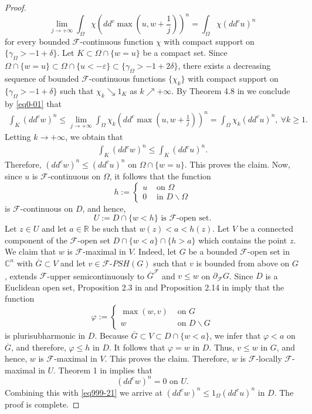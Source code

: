 \documentclass[3p,times]{elsarticle}
\numberwithin{equation}{section}
\newtheorem{The main theorem}[theorem]{The main theorem}
\theoremstyle{definition}
\begin{document}
\begin{proof}
\begin{equation} \label{eq0-01}
\lim_{j \to +\infty} \int_\Omega \chi (dd^c \max(u, w+\frac{1}{j}))^n  = \int_\Omega \chi (dd^c u)^n
\end{equation} 
for every bounded $\mathcal F $-continuous function $\chi$ with compact support on $\{ \gamma_\Omega  >-1+\delta \}$.
Let $K\subset \Omega \cap \{w=u\}$ be a compact set. Since $\Omega \cap \{w=u\} \subset \Omega \cap  \{u<-\varepsilon\}  \subset \{ \gamma_\Omega  >-1+  2 \delta \}$, there exists    a decreasing sequence of bounded $\mathcal F $-continuous functions  $\{\chi_k\}$   with compact support on $\{ \gamma_\Omega  >-1+\delta \}$ such that $\chi_k \searrow 1_K$ as $k \nearrow +\infty$. By
Theorem 4.8 in \cite{KW14}  we conclude by \eqref{eq0-01} that 
\begin{align*}
\int_K    (dd^c w)^n 
\leq \lim_{j \to +\infty} \int_\Omega \chi _k(dd^c \max(u, w+\frac{1}{j}))^n  
= \int_\Omega \chi_k (dd^c u)^n, \ \forall k \geq 1.
\end{align*}
Letting $k\to+\infty$, we obtain that 
\begin{align*}
\int _K   (dd^c w)^n 
\leq   \int_K (dd^c u)^n .
\end{align*}
Therefore, 
$
 (dd^c w)^n \leq  (dd^c u)^n \text{ on } \Omega \cap  \{w=u\}.
$
This proves the claim.   
Now, since $u$ is $\mathcal F$-continuous on $\Omega$, it follows that  the function 
$$
h := 
\begin{cases}
u & \text{ on } \Omega
\\ 0 & \text{ in } D \backslash \Omega 
\end{cases}
$$
is $\mathcal F$-continuous on $D$, and hence,  
$$U:= D\cap \{w<h \} \text{  is }\mathcal F\text{-open set}.$$ 
Let $z\in U$ and let $a\in \mathbb R$ be such that $w(z) < a< h (z)$. Let $V$   be a connected component of the $\mathcal F$-open set $D\cap \{w<a\} \cap \{h >a\}$ which contains the point $z$. 
We claim that  $w $ is $\mathcal F$-maximal in $V$. 
Indeed, let 
$G$ be a bounded  $\mathcal F$-open set in  $\mathbb C^n$ with $\overline G\subset V$ and let   $v\in \mathcal F \text{-} PSH(G)$ such that $v$ is  bounded from above  on $G$, extends $\mathcal F$-upper semicontinuously to $\overline{G}^{\mathcal F}$ and    $v\leq w$ on  $\partial_{\mathcal F} G$. Since $D$ is a Euclidean open set,  Proposition 2.3 in \cite{KS14} and Proposition 2.14 in \cite{KFW11} imply that  the function
$$\varphi  := \begin{cases} 
\max(w , v  )  
& \text{ on } G 
\\ w & \text{ on } D \backslash G 
\end{cases}$$ 
is  plurisubharmonic in $D$.  
Because  $\overline{G} \subset V \subset D\cap \{w<a\}$, we infer that $\varphi <a $ on $\overline{G} $, and therefore, $\varphi \leq h$ in $D$. It follows that 
$\varphi =w$ in $D$. Thus, $v\leq w$ in $G$, and hence, $w$ is $\mathcal F$-maximal in $V$. This proves the claim. 
Therefore,   $w$ is $\mathcal F$-locally $\mathcal F$-maximal in $U$.  Theorem 1 in \cite{HHV17} implies that 
$$(dd^c w)^n =0 \text{  on } U.$$
Combining this with \eqref{eq999-21} we arrive at 
$(dd^c w)^n \leq 1_\Omega (dd^c u)^n$ in $D$. 
The proof is complete.
\end{proof}
\end{document}
